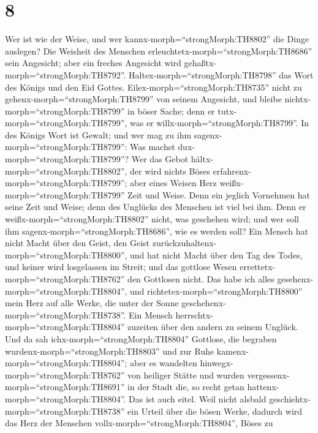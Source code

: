 \hypertarget{section-7}{%
\section{8}\label{section-7}}

 Wer ist wie der Weise, und wer
kannx-morph=``strongMorph:TH8802'' die Dinge auslegen? Die Weisheit des
Menschen erleuchtetx-morph=``strongMorph:TH8686'' sein Angesicht; aber
ein freches Angesicht wird gehaßtx-morph=``strongMorph:TH8792''.
 Haltex-morph=``strongMorph:TH8798'' das Wort des Königs und
den Eid Gottes.  Eilex-morph=``strongMorph:TH8735'' nicht zu
gehenx-morph=``strongMorph:TH8799'' von seinem Angesicht, und bleibe
nichtx-morph=``strongMorph:TH8799'' in böser Sache; denn er
tutx-morph=``strongMorph:TH8799'', was er
willx-morph=``strongMorph:TH8799''.  In des Königs Wort ist
Gewalt; und wer mag zu ihm sagenx-morph=``strongMorph:TH8799'': Was
machst dux-morph=``strongMorph:TH8799''?  Wer das Gebot
hältx-morph=``strongMorph:TH8802'', der wird nichts Böses
erfahrenx-morph=``strongMorph:TH8799''; aber eines Weisen Herz
weißx-morph=``strongMorph:TH8799'' Zeit und Weise.  Denn ein
jeglich Vornehmen hat seine Zeit und Weise; denn des Unglücks des
Menschen ist viel bei ihm.  Denn er
weißx-morph=``strongMorph:TH8802'' nicht, was geschehen wird; und wer
soll ihm sagenx-morph=``strongMorph:TH8686'', wie es werden soll?
 Ein Mensch hat nicht Macht über den Geist, den Geist
zurückzuhaltenx-morph=``strongMorph:TH8800'', und hat nicht Macht über
den Tag des Todes, und keiner wird losgelassen im Streit; und das
gottlose Wesen errettetx-morph=``strongMorph:TH8762'' den Gottlosen
nicht.  Das habe ich alles
gesehenx-morph=``strongMorph:TH8804'', und
richtetex-morph=``strongMorph:TH8800'' mein Herz auf alle Werke, die
unter der Sonne geschehenx-morph=``strongMorph:TH8738''. Ein Mensch
herrschtx-morph=``strongMorph:TH8804'' zuzeiten über den andern zu
seinem Unglück.  Und da sah
ichx-morph=``strongMorph:TH8804'' Gottlose, die begraben
wurdenx-morph=``strongMorph:TH8803'' und zur Ruhe
kamenx-morph=``strongMorph:TH8804''; aber es wandelten
hinwegx-morph=``strongMorph:TH8762'' von heiliger Stätte und wurden
vergessenx-morph=``strongMorph:TH8691'' in der Stadt die, so recht getan
hattenx-morph=``strongMorph:TH8804''. Das ist auch eitel. 
Weil nicht alsbald geschiehtx-morph=``strongMorph:TH8738'' ein Urteil
über die bösen Werke, dadurch wird das Herz der Menschen
vollx-morph=``strongMorph:TH8804'', Böses zu
